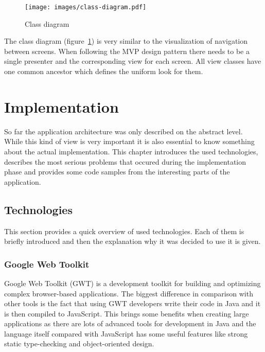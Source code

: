 \documentclass[12pt,oneside,final]{fithesis2}
\begin{document}
\begin{figure}[ht!]
\centering
\texttt{[image: images/class-diagram.pdf]}
\caption{Class diagram}
\label{fig:class-diagram}
\end{figure}

The class diagram (figure~\ref{fig:class-diagram}) is very similar to the visualization of navigation between screens.
When following the MVP design pattern there needs to be a single presenter and the corresponding view for each screen.
All view classes have one common ancestor which defines the uniform look for them.


\chapter{Implementation}
So far the application architecture was only described on the abstract level.
While this kind of view is very important it is also essential to know something about the actual implementation.
This chapter introduces the used technologies, describes the most serious problems that occured during the implementation phase and provides some code samples from the interesting parts of the application.

\section{Technologies}
This section provides a quick overview of used technologies.
Each of them is briefly introduced and then the explanation why it was decided to use it is given.

\subsection{Google Web Toolkit}
Google Web Toolkit (GWT) is a development toolkit for building and optimizing complex browser-based applications. \cite{gwtoverview}
The biggest difference in comparison with other tools is the fact that using GWT developers write their code in Java and it is then compiled to JavaScript.
This brings some benefits when creating large applications as there are lots of advanced tools for development in Java and the language itself compared with JavaScript has some useful features like strong static type-checking and object-oriented design.
\end{document}
